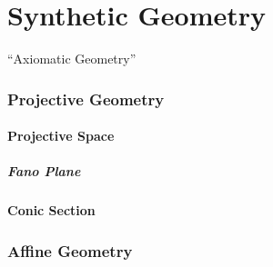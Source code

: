 \part{Synthetic Geometry}\label{sec:synthetic_geometry}

``Axiomatic Geometry''



\section{Projective Geometry}\label{sec:projective_geometry}

\subsection{Projective Space}\label{sec:projective_space}

\subsubsection{Fano Plane}\label{sec:fano_plane}



\subsection{Conic Section}\label{sec:conic_section}



\section{Affine Geometry}\label{sec:affine_geometry}

